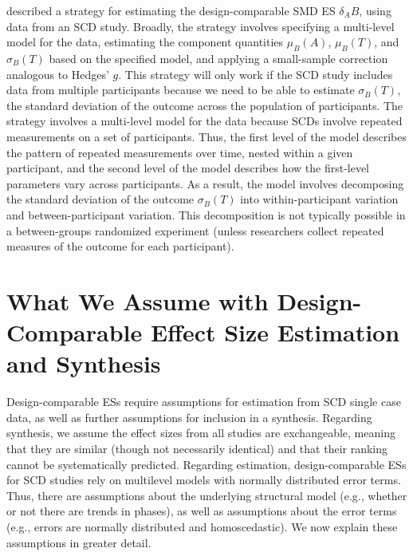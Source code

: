 \documentclass[
]{book}
\begin{document}
\citet{Pustejovsky2014design} described a strategy for estimating the design-comparable SMD ES \(\delta_AB\), using data from an SCD study. Broadly, the strategy involves specifying a multi-level model for the data, estimating the component quantities \(\mu_B(A)\), \(\mu_B(T)\), and \(\sigma_B(T)\) based on the specified model, and applying a small-sample correction analogous to Hedges' \(g\). This strategy will only work if the SCD study includes data from multiple participants because we need to be able to estimate \(\sigma_B(T)\), the standard deviation of the outcome across the population of participants. The strategy involves a multi-level model for the data because SCDs involve repeated measurements on a set of participants. Thus, the first level of the model describes the pattern of repeated measurements over time, nested within a given participant, and the second level of the model describes how the first-level parameters vary across participants. As a result, the model involves decomposing the standard deviation of the outcome \(\sigma_B(T)\) into within-participant variation and between-participant variation. This decomposition is not typically possible in a between-groups randomized experiment (unless researchers collect repeated measures of the outcome for each participant).

\hypertarget{what-we-assume-with-design-comparable-effect-size-estimation-and-synthesis}{%
\section{What We Assume with Design-Comparable Effect Size Estimation and Synthesis}\label{what-we-assume-with-design-comparable-effect-size-estimation-and-synthesis}}

Design-comparable ESs require assumptions for estimation from SCD single case data, as well as further assumptions for inclusion in a synthesis. Regarding synthesis, we assume the effect sizes from all studies are exchangeable, meaning that they are similar (though not necessarily identical) and that their ranking cannot be systematically predicted. Regarding estimation, design-comparable ESs for SCD studies rely on multilevel models with normally distributed error terms. Thus, there are assumptions about the underlying structural model (e.g., whether or not there are trends in phases), as well as assumptions about the error terms (e.g., errors are normally distributed and homoscedastic). We now explain these assumptions in greater detail.
\end{document}
